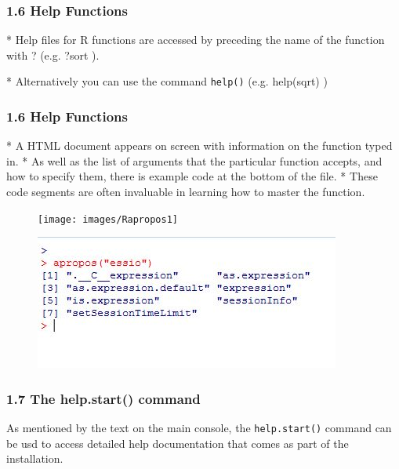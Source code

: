  
 
 \frametitle{1.6 Help Functions}
 
*  Help files for R functions are accessed by preceding the name of the function with ? (e.g. ?sort
 ). 
 
*  Alternatively you can use the command \texttt{help()} (e.g. help(sqrt) )

 
 
 
 
 \frametitle{1.6 Help Functions}
 
*  A HTML document appears on screen with information on the function typed in. 
*  As well
 as the list of arguments that the particular function accepts, and how to specify them, there is
 example code at the bottom of the file. 
*  These code segments are often invaluable in learning
 how to master the function.

 
 
 
 
 
 
 \begin{figure}
 \centering
 \texttt{[image: images/Rapropos1]}       
 \end{figure}
    
 
 \begin{figure}
 \centering
 \includegraphics[width=0.7\linewidth]{images/Rapropos2}       
 \end{figure}
    
 
 
 
 \frametitle{1.7 The help.start() command}
 As mentioned by the text on the main console, the \texttt{help.start()} command can be usd to
 access detailed help documentation that comes as part of the installation.
 
